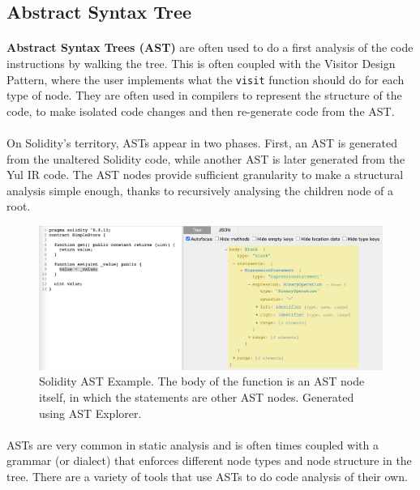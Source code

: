 \subsection*{Abstract Syntax Tree}
\paragraph*{}
\textbf{Abstract Syntax Trees (AST)} are often used to do a first analysis of the code instructions by walking the tree. This is often coupled with the Visitor Design Pattern, where the user implements what the \lstinline[columns=fixed]{visit} function should do for each type of node. They are often used in compilers to represent the structure of the code, to make isolated code changes and then re-generate code from the AST.

\paragraph*{}
On Solidity's territory, ASTs appear in two phases. First, an AST is generated from the unaltered Solidity code, while another AST is later generated from the Yul IR code. The AST nodes provide sufficient granularity to make a structural analysis simple enough, thanks to recursively analysing the children node of a root.

\begin{figure}
    \centering
    \includegraphics[width=15cm]{images/solidity_ast_example.png}
    \caption{Solidity AST Example. The body of the function is an AST node itself, in which the statements are other AST nodes. Generated using AST Explorer.}
    \label{fig:solidity-ast-example}
\end{figure}

\paragraph*{}
ASTs are very common in static analysis and is often times coupled with a grammar (or dialect) that enforces different node types and node structure in the tree. There are a variety of tools that use ASTs to do code analysis of their own.

